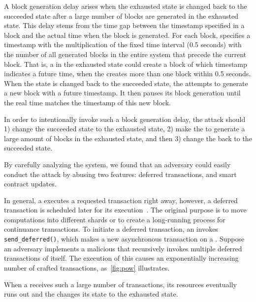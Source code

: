 A block generation delay arises when the exhausted state is changed back to the
succeeded state after a large number of blocks are generated in the exhausted
state. This delay stems from the time gap between the timestamp specified in a
block and the actual time when the block is generated. For each block, \eos
specifies a timestamp with the multiplication of the fixed time interval (0.5
seconds) with the number of all generated blocks in the entire \eos system that
precede the current block. That is, a \BP in the exhausted state could create a
block of which timestamp indicates a future time, when the \BP creates more than
one block within 0.5 seconds.
%
When the state is changed back to the succeeded state, the \BP attempts to
generate a new block with a future timestamp. It then pauses its block
generation until the real time matches the timestamp of this new block.


In order to intentionally invoke such a block generation delay, the attack
should 1) change the succeeded state to the exhausted state, 2) make the \BP to
generate a large amount of blocks in the exhausted state, and then 3) change the
\BP back to the succeeded state.

By carefully analyzing the \eos system, we found that an adversary could easily
conduct the \NODEDOS attack by abusing two \eos features:
deferred transactions, and smart contract updates.

In general, a \BP executes a requested transaction right away, however, a
deferred transaction is scheduled later for its execution~\cite{EOSWHITEPAPER}.
The original purpose is to move computations into different shards or to create
a long-running process for continuance transactions.
%
To initiate a deferred transaction, an \SC invokes \texttt{send\_deferred()},
which makes a new asynchronous transaction on a \BP. Suppose an adversary
implements a malicious \SC that recursively invokes multiple deferred
transactions of itself. The execution of this \SC causes an exponentially
increasing number of crafted transactions, as~\autoref{fig:pow} illustrates.

When a \BP receives such a large number of transactions, its resources
eventually runs out and the \BP changes its state to the exhausted state.

